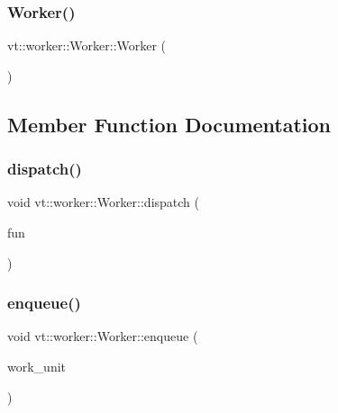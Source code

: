 \subsubsection{\texorpdfstring{Worker()}{Worker()}\hspace{0.1cm}{\footnotesize\ttfamily [2/2]}}
{\footnotesize\ttfamily vt\+::worker\+::\+Worker\+::\+Worker (\begin{DoxyParamCaption}\item[{\hyperlink{structvt_1_1worker_1_1_worker}{Worker} const \&}]{ }\end{DoxyParamCaption})\hspace{0.3cm}{\ttfamily [delete]}}



\subsection{Member Function Documentation}
\mbox{\label{structvt_1_1worker_1_1_worker_ac380d64d45f7fa0eb0d97914ed02ffe3}} 
\subsubsection{\texorpdfstring{dispatch()}{dispatch()}}
{\footnotesize\ttfamily void vt\+::worker\+::\+Worker\+::dispatch (\begin{DoxyParamCaption}\item[{\hyperlink{structvt_1_1worker_1_1_worker_a644fce67088c46d1e9e3d1e214d2e632}{Worker\+Fun\+Type}}]{fun }\end{DoxyParamCaption})}

\mbox{\label{structvt_1_1worker_1_1_worker_a9621953208f1836a95b1f29b0fc7d3b6}} 
\subsubsection{\texorpdfstring{enqueue()}{enqueue()}}
{\footnotesize\ttfamily void vt\+::worker\+::\+Worker\+::enqueue (\begin{DoxyParamCaption}\item[{\hyperlink{namespacevt_1_1worker_a59d2fcdafa81fc0af7f921a258e42202}{Work\+Unit\+Type} const \&}]{work\+\_\+unit }\end{DoxyParamCaption})}

